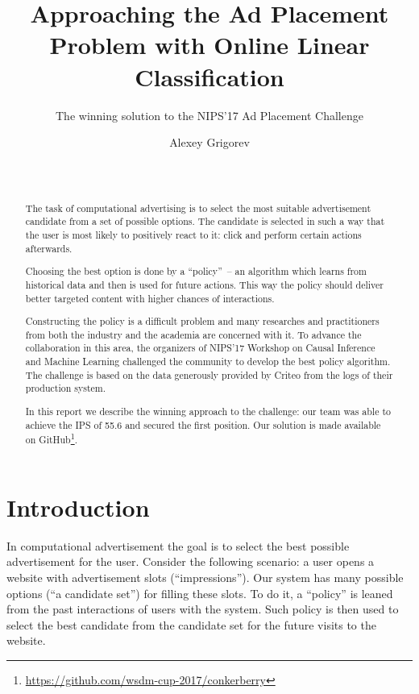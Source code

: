 \documentclass{sig-alternate}
\begin{document}
\title{Approaching the Ad Placement Problem with Online Linear Classification}
\subtitle{The winning solution to the NIPS'17 Ad Placement Challenge}

\author{
  \alignauthor
  Alexey Grigorev\\
  \\
  \\
  \alignauthor
}

\maketitle

\begin{abstract}

The task of computational advertising is to select the most suitable 
advertisement candidate from a set of possible options. The candidate 
is selected in such a way that the user is most likely to positively 
react to it: click and perform certain actions afterwards. 

Choosing the best option is done by a ``policy''~-- an algorithm which 
learns from historical data and then is used for future actions. This 
way the policy should deliver better targeted content with higher chances 
of interactions.

Constructing the policy is a difficult problem and many researches and
practitioners from both the industry and the academia are concerned with it.
To advance the collaboration in this area, the organizers of 
NIPS'17 Workshop on Causal Inference and Machine Learning 
challenged the community to develop the best policy algorithm. The challenge 
is based on the data generously provided by Criteo from the logs 
of their production system.

In this report we describe the winning approach to the challenge: our team 
was able to achieve the IPS of 55.6 and secured the first position. 
Our solution is made available on GitHub\footnote{\url{https://github.com/wsdm-cup-2017/conkerberry}}.

\end{abstract}


\section{Introduction}

In computational advertisement the goal is to select the best possible 
advertisement for the user. Consider the following scenario: a user 
opens a website with advertisement slots (``impressions'').
Our system has many possible options (``a candidate set'') for filling these slots. 
To do it, a ``policy'' is leaned from the past interactions of users with 
the system. Such policy is then used to select the best candidate 
from the candidate set for the future visits to the website.
\end{document}
